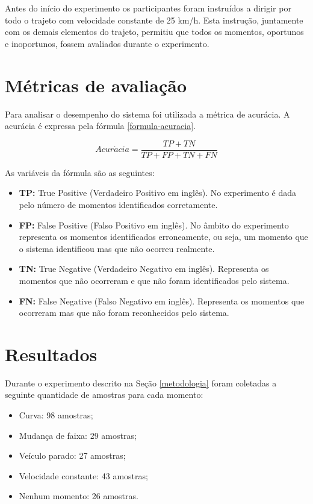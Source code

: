 Antes do início do experimento os participantes foram instruídos a dirigir por todo o trajeto com
velocidade constante de 25 km/h. Esta instrução, juntamente com os demais elementos do trajeto,
permitiu que todos os momentos, oportunos e inoportunos, fossem avaliados durante o experimento.

\section{Métricas de avaliação}
\label{metricas}

Para analisar o desempenho do sistema foi utilizada a métrica de acurácia. A acurácia é expressa pela
fórmula \ref{formula-acuracia}.

\begin{equation}
  Acur\acute{a}cia = \frac{TP + TN}{TP + FP + TN + FN}
\label{formula-acuracia}
\end{equation}

As variáveis da fórmula são as seguintes:

\begin{itemize}
  \item \textbf{TP:} True Positive (Verdadeiro Positivo em inglês). No experimento é dada pelo número de
  momentos identificados corretamente.
  \item \textbf{FP:} False Positive (Falso Positivo em inglês). No âmbito do experimento representa os
  momentos identificados erroneamente, ou seja, um momento que o sistema identificou mas que não ocorreu
  realmente.
  \item \textbf{TN:} True Negative (Verdadeiro Negativo em inglês). Representa os momentos que não ocorreram
  e que não foram identificados pelo sistema.
  \item \textbf{FN:} False Negative (Falso Negativo em inglês). Representa os momentos que ocorreram mas
  que não foram reconhecidos pelo sistema.
\end{itemize}

\section{Resultados}
\label{resultados}

Durante o experimento descrito na Seção \ref{metodologia} foram coletadas a seguinte quantidade de amostras para cada momento:

\begin{itemize}
  \item Curva: 98 amostras;
  \item Mudança de faixa: 29 amostras;
  \item Veículo parado: 27 amostras;
  \item Velocidade constante: 43 amostras;
  \item Nenhum momento: 26 amostras.
\end{itemize}

